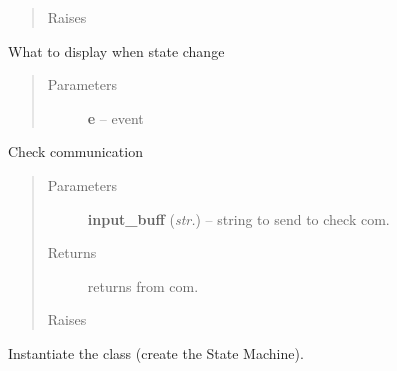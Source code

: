 \documentclass[letterpaper,10pt,english]{sphinxmanual}
\begin{document}
\begin{fulllineitems}
\begin{fulllineitems}
\begin{quote}
\begin{description}
\item[{Raises}] \leavevmode
{}

\end{description}\end{quote}

\end{fulllineitems}


\begin{fulllineitems}
\label{enuActor.Devices:enuActor.Devices.Device.Device.printstateonchange}
What to display when state change
\begin{quote}\begin{description}
\item[{Parameters}] \leavevmode
\textbf{e} -- event

\end{description}\end{quote}

\end{fulllineitems}


\begin{fulllineitems}
\label{enuActor.Devices:enuActor.Devices.Device.Device.send}
Check communication
\begin{quote}\begin{description}
\item[{Parameters}] \leavevmode
\textbf{input\_buff} (\emph{str.}) -- string to send to check com.

\item[{Returns}] \leavevmode
returns from com.

\item[{Raises}] \leavevmode
{\hyperref[enuActor.Devices:enuActor.Devices.Error.CommErr]{}}

\end{description}\end{quote}

\end{fulllineitems}


\begin{fulllineitems}
\label{enuActor.Devices:enuActor.Devices.Device.Device.startFSM}
Instantiate the {\hyperref[enuActor:module-enuActor.MyFSM]{}} class (create the State Machine).


\end{fulllineitems}
\end{fulllineitems}
\end{document}
